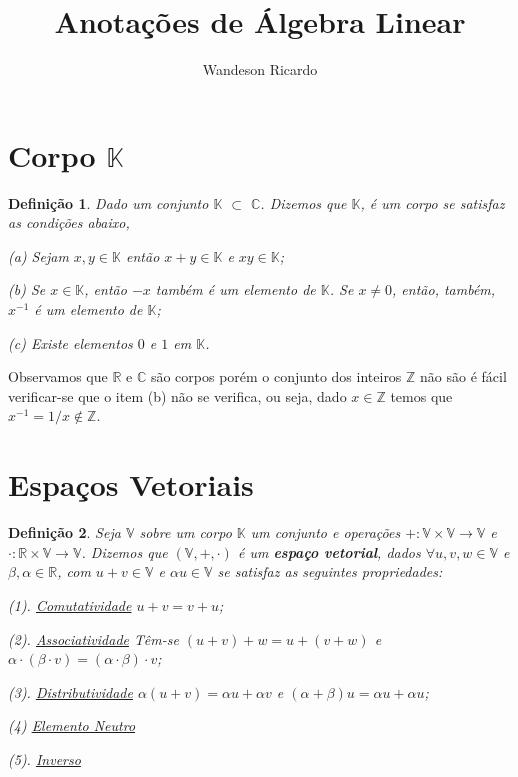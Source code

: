 \documentclass[12pt,a4paper]{article}
\title{Anotações de Álgebra Linear}
\author{Wandeson Ricardo}
\newtheorem{definicao}{Definição}
\begin{document}
\maketitle


\section{Corpo $\mathbb{K}$}

\begin{definicao}
	Dado um conjunto $\mathbb{K}$ $\subset$ $\mathbb{C}$. Dizemos que $\mathbb{K}$,  é um corpo se satisfaz as condições abaixo,
	
	\item (a) Sejam $ x,y \in \mathbb{K}$ então $x+y \in \mathbb{K}$ e $xy \in \mathbb{K}$;
	
	\item (b) Se $x \in \mathbb{K}$, então $-x$ também é um elemento de $\mathbb{K}$. Se $x \neq 0 $, então, também, $x^{-1}$ é um elemento de $\mathbb{K}$;
	
	\item (c) Existe elementos $0$ e $1$ em $\mathbb{K}$.
	
\end{definicao}

Observamos que $\mathbb{R}$ e $\mathbb{C}$ são corpos porém o conjunto dos inteiros $\mathbb{Z}$ não são é fácil verificar-se que o item (b) não se verifica, ou seja, dado $x \in \mathbb{Z}$ temos que $x^{-1} = 1/x  \notin \mathbb{Z}$.

\section{Espaços Vetoriais}

\begin{definicao}
	Seja $\mathbb{V}$ sobre um corpo $\mathbb{K}$  um conjunto e operações $+: \mathbb{V}\times\mathbb{V} \rightarrow \mathbb{V}$ e $\cdot : \mathbb{R} \times \mathbb{V} \rightarrow \mathbb{V}$. Dizemos que $(\mathbb{V}, +, \cdot )$ é um \textbf{\textit{espaço vetorial}}, dados $\forall u,v,w \in \mathbb{V}$ e $\beta, \alpha \in \mathbb{R}$, com $ u + v \in \mathbb{V}$ e $\alpha u \in \mathbb{V}$ se satisfaz as seguintes propriedades:\\
	
	\item (1). \underline{Comutatividade} $u + v = v + u$;
	
	\item (2).  \underline{Associatividade} Têm-se $( u + v ) + w = u + (v + w)$ e $\alpha \cdot (\beta \cdot v)  = (\alpha \cdot \beta)\cdot  v$;
	
	\item (3). \underline{Distributividade} $ \alpha \left( u + v \right) = \alpha u + \alpha v$ e $ ( \alpha + \beta ) u = \alpha u + \alpha u$;
	
	\item (4) \underline{Elemento Neutro} 
	
	\item (5). \underline{Inverso}
	
\end{definicao}
	
\end{document}
